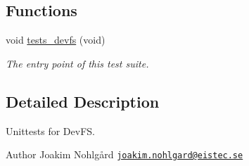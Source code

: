 \subsection*{Functions}
\begin{DoxyCompactItemize}
\item 
void \hyperlink{group__unittests_ga03275129153bd3a312c96576f1c15526}{tests\+\_\+devfs} (void)
\begin{DoxyCompactList}\small\item\em The entry point of this test suite. \end{DoxyCompactList}\end{DoxyCompactItemize}


\subsection{Detailed Description}
Unittests for Dev\+FS. 

\begin{DoxyAuthor}{Author}
Joakim Nohlgård \href{mailto:joakim.nohlgard@eistec.se}{\tt joakim.\+nohlgard@eistec.\+se} 
\end{DoxyAuthor}
